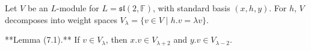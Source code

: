 Let $V$ be an $L$-module for $L = \mathfrak{sl}(2, \mathbb{F})$, with standard basis $(x, h, y)$. For $h$, $V$ decomposes into weight spaces $V_\lambda = \{v \in V \mid h.v = \lambda v\}$.

**Lemma (7.1).** If $v \in V_\lambda$, then $x.v \in V_{\lambda+2}$ and $y.v \in V_{\lambda-2}$.
